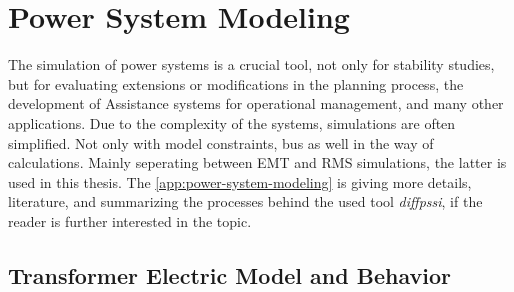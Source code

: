 

\section{Power System Modeling}

The simulation of power systems is a crucial tool, not only for stability studies, but for evaluating extensions or modifications in the planning process, the development of Assistance systems for operational management, and many other applications. \quelle 
Due to the complexity of the systems, simulations are often simplified. 
Not only with model constraints, bus as well in the way of calculations. 
Mainly seperating between \acf{EMT} and \acf{RMS} simulations, the latter is used in this thesis. 
The \autoref{app:power-system-modeling} is giving more details, literature, and summarizing the processes behind the used tool \textit{diffpssi}, if the reader is further interested in the topic.

\subsection{Transformer Electric Model and Behavior}
\label{sec:trafo-model}


